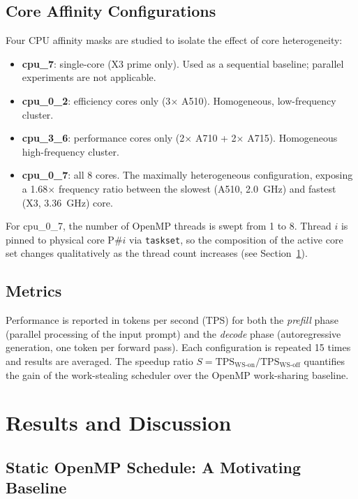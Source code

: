 \documentclass[11pt,english]{article}
\begin{document}
\subsection{Core Affinity Configurations}
 
Four CPU affinity masks are studied to isolate the effect of core heterogeneity:
 
\begin{itemize}
    \item \textbf{cpu\_7}: single-core (X3 prime only). Used as a sequential baseline; parallel experiments are not applicable.
    \item \textbf{cpu\_0\_2}: efficiency cores only (3$\times$ A510). Homogeneous, low-frequency cluster.
    \item \textbf{cpu\_3\_6}: performance cores only (2$\times$ A710 + 2$\times$ A715). Homogeneous high-frequency cluster.
    \item \textbf{cpu\_0\_7}: all 8 cores. The maximally heterogeneous configuration, exposing a 1.68$\times$ frequency ratio between the slowest (A510, 2.0~GHz) and fastest (X3, 3.36~GHz) core.
\end{itemize}
 
For cpu\_0\_7, the number of OpenMP threads is swept from 1 to 8. Thread $i$ is pinned to physical core P\#$i$ via \texttt{taskset}, so the composition of the active core set changes qualitatively as the thread count increases (see Section~\ref{sec:discussion}).
 
\subsection{Metrics}
 
Performance is reported in tokens per second (TPS) for both the \emph{prefill} phase (parallel processing of the input prompt) and the \emph{decode} phase (autoregressive generation, one token per forward pass). Each configuration is repeated 15 times and results are averaged. The speedup ratio $S = \text{TPS}_{\text{WS-on}} / \text{TPS}_{\text{WS-off}}$ quantifies the gain of the work-stealing scheduler over the OpenMP work-sharing baseline.
 
\section{Results and Discussion}
\label{sec:discussion}
 
\subsection{Static OpenMP Schedule: A Motivating Baseline}
 
\end{document}
